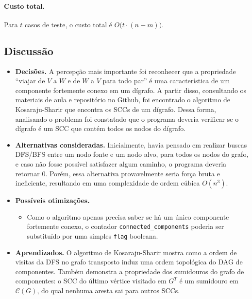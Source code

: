 \documentclass[11pt,a4paper]{article}
\begin{document}
\paragraph{Custo total.} Para $t$ casos de teste, o custo total é
$O\bigl(t \cdot (n+m)\bigr)$.

\subsection{Discussão}

\begin{itemize}
    \item \textbf{Decisões.} A percepção mais
    importante foi reconhecer que a propriedade ``viajar de $V$ a
    $W$ e de $W$ a $V$ para todo par'' é uma característica de um componente fortemente conexo em um dígrafo. A partir disso, consultando os materiais de aula e \href{https://github.com/BrunoGrisci/projeto-e-analise-de-algoritmos/blob/main/paa1/graph_search.ipynb}{repositório no Github}, foi encontrado o algoritmo de Kosaraju-Sharir que encontra os SCCs de um dígrafo. Dessa forma, analisando o problema foi constatado que o programa deveria verificar se o dígrafo é um SCC que contém todos os nodos do dígrafo.

    \item \textbf{Alternativas consideradas.} Inicialmente, havia pensado em realizar buscas DFS/BFS entre um nodo fonte e um nodo alvo, para todos os nodos do grafo, e caso não fosse possível satisfazer algum caminho, o programa deveria retornar $0$. Porém, essa alternativa provavelmente seria força bruta e ineficiente, resultando em uma complexidade de ordem cúbica $O(n^3)$.

    \item \textbf{Possíveis otimizações.}
    \begin{itemize}
        \item Como o algoritmo apenas precisa saber se há um único
        componente fortemente conexo, o contador 
        \texttt{connected\_components} poderia ser
        substituído por uma simples \texttt{flag} booleana.
    \end{itemize}

    \item \textbf{Aprendizados.} O algoritmo de Kosaraju-Sharir mostra como
    a ordem de visitas da DFS no grafo transposto induz uma
    ordem topológica do DAG de componentes. Também demonstra a
    propriedade dos sumidouros do grafo de componentes: o SCC do
    último vértice visitado em $G^T$ é um sumidouro
    em $\mathcal{C}(G)$, do qual nenhuma aresta sai para outros
    SCCs.
\end{itemize}
\end{document}
